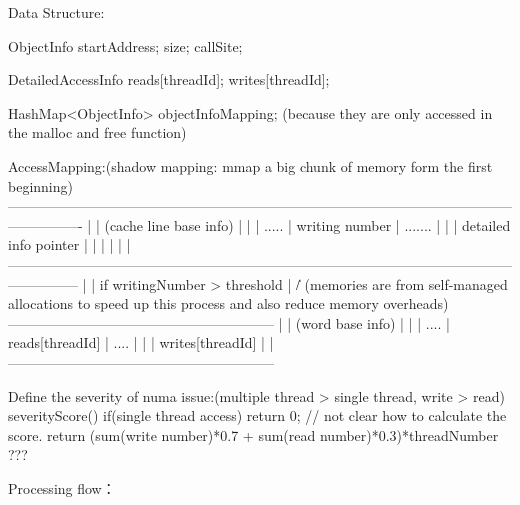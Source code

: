 Data Structure:

        ObjectInfo {
            startAddress;
            size;
            callSite;
        }

        DetailedAccessInfo {
            reads[threadId];
            writes[threadId];
        }

        HashMap<ObjectInfo> objectInfoMapping; (because they are only accessed in the malloc and free function)

        AccessMapping:(shadow mapping: mmap a big chunk of memory form the first beginning)
        ----------------------------------------------------------------------------------------------------------------------------
        |                      |      (cache line base info)       |                                                               |
        |            .....     |   writing number                  |             .......                                           |
        |                      |   detailed info pointer           |                                                               |
        |                      |                                   |                                                               |
        ---------------------------------------------------------------------------------------------------------------------------
                                                  |
                                                  |  if writingNumber > threshold
                                                  |
                                                 \|/   (memories are from self-managed allocations to speed up this process
                                                        and also reduce memory overheads)
                    ---------------------------------------------------------
                    |        |         (word base info)        |            |
                    |  ....  |     reads[threadId]             |  ....      |
                    |        |     writes[threadId]            |            |
                    ---------------------------------------------------------


Define the severity of numa issue:(multiple thread > single thread, write > read)
        severityScore(){
            if(single thread access){
                return 0;
            }
            // not clear how to calculate the score.
            return (sum(write number)*0.7 + sum(read number)*0.3)*threadNumber  ???
        }


Processing flow：

